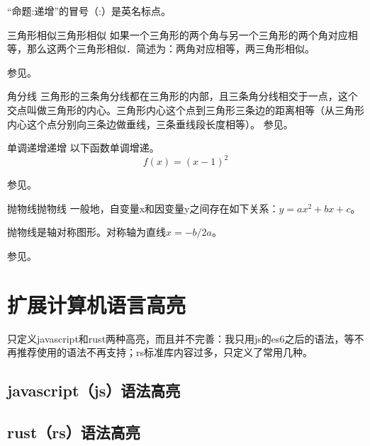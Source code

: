 \documentclass{morelull}
\begin{document}
\begin{注意}
    “命题:递增”的冒号（:）是英名标点。
\end{注意}

\begin{定理}{三角形相似}{三角形相似}
    如果一个三角形的两个角与另一个三角形的两个角对应相等，那么这两个三角形相似．简述为：两角对应相等，两三角形相似。

    参见。
\end{定理}

\begin{结论}{}{角分线}
    三角形的三条角分线都在三角形的内部，且三条角分线相交于一点，这个交点叫做三角形的内心。三角形内心这个点到三角形三条边的距离相等（从三角形内心这个点分别向三条边做垂线，三条垂线段长度相等）。
    参见。
\end{结论}

\begin{命题}{单调递增}{递增}
以下函数单调增递。
\[
    f(x) = (x - 1) ^ 2
\]

参见。
\end{命题}

\begin{定义}{抛物线}{抛物线}
    一般地，自变量x和因变量y之间存在如下关系：$y=ax^2+bx+c$。

    抛物线是轴对称图形。对称轴为直线$x=-b/2a$。

    参见。
\end{定义}

\section{扩展计算机语言高亮}
只定义javascript和rust两种高亮，而且并不完善：我只用js的es6之后的语法，等不再推荐使用的语法不再支持；rs标准库内容过多，只定义了常用几种。

\subsection{javascript（js）语法高亮}


\subsection{rust（rs）语法高亮}

\end{document}
